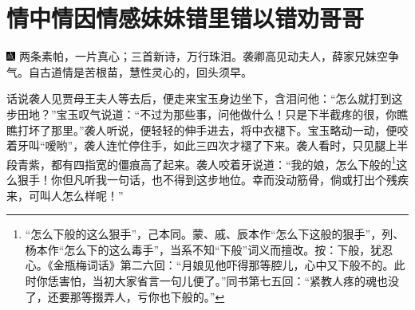 

\chapter{情中情因情感妹妹\hspace{.5em}错里错以错劝哥哥}

{\includegraphics[width=3mm]{../Images/00005}  \kaishu 两条素帕，一片真心；三首新诗，万行珠泪。袭卿高见动夫人，薛家兄妹空争气。自古道情是苦根苗，慧性灵心的，回头须早。}

话说袭人见贾母王夫人等去后，便走来宝玉身边坐下，含泪问他：“怎么就打到这步田地？”宝玉叹气说道：“不过为那些事，问他做什么！只是下半截疼的很，你瞧瞧打坏了那里。”袭人听说，便轻轻的伸手进去，将中衣褪下。宝玉略动一动，便咬着牙叫“嗳哟”，袭人连忙停住手，如此三四次才褪了下来。袭人看时，只见腿上半段青紫，都有四指宽的僵痕高了起来。袭人咬着牙说道：“我的娘，怎么下般的\footnote{“怎么下般的这么狠手”，己本同。蒙、戚、辰本作“怎么下这般的狠手”，列、杨本作“怎么下的这么毒手”，当系不知“下般”词义而擅改。按：下般，犹忍心。《金瓶梅词话》第二六回：“月娘见他吓得那等腔儿，心中又下般不的。此时你恁害怕，当初大家省言一句儿便了。”同书第七五回：“紧教人疼的魂也没了，还要那等掇弄人，亏你也下般的。”}这么狠手！你但凡听我一句话，也不得到这步地位。幸而没动筋骨，倘或打出个残疾来，可叫人怎么样呢！”

